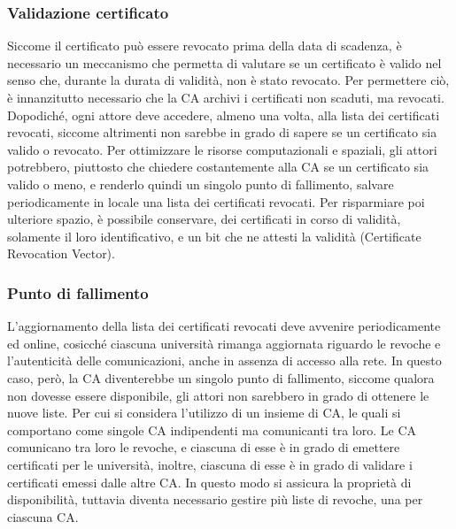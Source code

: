 \documentclass[a4paper,12pt]{article}
\begin{document}
\subsubsection{Validazione certificato} Siccome il certificato può essere revocato prima della data di scadenza, è necessario un meccanismo che permetta di valutare se un certificato è valido nel senso che, durante la durata di validità, non è stato revocato. Per permettere ciò, è innanzitutto necessario che la CA archivi i certificati non scaduti, ma revocati. Dopodiché, ogni attore deve accedere, almeno una volta, alla lista dei certificati revocati, siccome altrimenti non sarebbe in grado di sapere se un certificato sia valido o revocato. Per ottimizzare le risorse computazionali e spaziali, gli attori potrebbero, piuttosto che chiedere costantemente alla CA se un certificato sia valido o meno, e renderlo quindi un singolo punto di fallimento, salvare periodicamente in locale una lista dei certificati revocati. Per risparmiare poi ulteriore spazio, è possibile conservare, dei certificati in corso di validità, solamente il loro identificativo, e un bit che ne attesti la validità (Certificate Revocation Vector).
\subsubsection{Punto di fallimento} L'aggiornamento della lista dei certificati revocati deve avvenire periodicamente ed online, cosicché ciascuna università rimanga aggiornata riguardo le revoche e l'autenticità delle comunicazioni, anche in assenza di accesso alla rete.
\newline In questo caso, però, la CA diventerebbe un singolo punto di fallimento, siccome qualora non dovesse essere disponibile, gli attori non sarebbero in grado di ottenere le nuove liste. Per cui si considera l'utilizzo di un insieme di CA, le quali si comportano come singole CA indipendenti ma comunicanti tra loro. Le CA comunicano tra loro le revoche, e ciascuna di esse è in grado di emettere certificati per le università, inoltre, ciascuna di esse è in grado di validare i certificati emessi dalle altre CA. In questo modo si assicura la proprietà di disponibilità, tuttavia diventa necessario gestire più liste di revoche, una per ciascuna CA.
\end{document}

